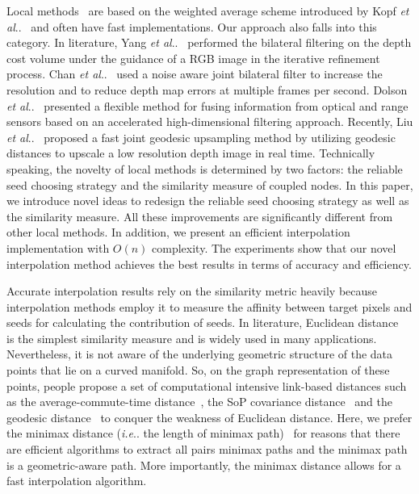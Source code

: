 \documentclass[preprint,10pt,5p,times,twocolumn]{elsarticle}
\makeatletter
\DeclareRobustCommand\onedot{\futurelet\@let@token\@onedot}
\def\@onedot{\ifx\@let@token.\else.\null\fi\xspace}
\def\ie{\emph{i.e}\onedot} \def\Ie{\emph{I.e}\onedot}
\def\etal{\emph{et al}\onedot}
\makeatother
\begin{document}
Local methods~\cite{Liu2013,Dolson2010,Kopf2007,YangQingxiong2007,Theobalt2008} are based on the weighted average scheme introduced by Kopf \etal~\cite{Kopf2007} and often have fast implementations. Our approach also falls into this category. In literature, Yang \etal~\cite{YangQingxiong2007} performed the bilateral filtering on the depth cost volume under the guidance of a RGB image in the iterative refinement process. Chan \etal~\cite{Theobalt2008} used a noise aware joint bilateral filter to increase the resolution and to reduce depth map errors at multiple frames per second. Dolson \etal~\cite{Dolson2010} presented a flexible method for fusing information from optical and range sensors based on an accelerated high-dimensional filtering approach. Recently, Liu \etal~\cite{Liu2013} proposed a fast joint geodesic upsampling method by utilizing geodesic distances to upscale a low resolution depth image in real time. Technically speaking, the novelty of local methods is determined by two factors: the reliable seed choosing strategy and the similarity measure of coupled nodes. In this paper, we introduce novel ideas to redesign the reliable seed choosing strategy as well as the similarity measure. All these improvements are significantly different from other local methods. In addition, we  present an efficient interpolation implementation with $O(n)$ complexity. The experiments show that our novel interpolation method achieves the best results in terms of accuracy and efficiency.

Accurate interpolation results rely on the similarity metric heavily because interpolation methods employ it to measure the affinity between target pixels and seeds for calculating the contribution of seeds. In literature, Euclidean distance~\cite{Kopf2007} is the simplest similarity measure and is widely used in many applications. Nevertheless, it is not aware of the underlying geometric structure of the data points that lie on a curved manifold. So, on the graph representation of these points, people propose a set of computational intensive link-based distances such as the average-commute-time distance~\cite{Fouss2007}, the SoP covariance distance~\cite{Mantrach2010} and the geodesic distance~\cite{Liu2013} to conquer the weakness of Euclidean distance. Here, we prefer the minimax distance (\ie the length of minimax path)~\cite{Kim2013} for reasons that there are efficient algorithms to extract all pairs minimax paths and the minimax path is a geometric-aware path. More importantly, the minimax distance allows for a fast interpolation algorithm.
\end{document}
